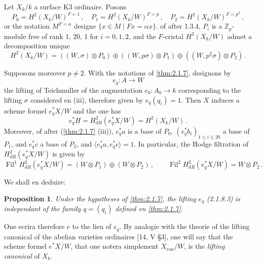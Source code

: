 \documentclass[12pt,a4paper]{article}
\theoremstyle{plain}
\newtheorem{proposition}[theorem]{Proposition}
\theoremstyle{definition}
\theoremstyle{remark}
\DeclareMathOperator{\Fil}{Fil}
\begin{document}
\paragraph{}

Let $X_k/k$ a surface K3 ordinaire. Posons
\begin{equation}\label{eq:2.1.8.1}
P_0 = H^2(X_k/W)^{F=1}\,, \quad P_1 = H^2(X_k/W)^{F=p}\,, \quad P_2 = H^2(X_k/W)^{F=p^2}\,,
\end{equation}
or the notation $M^{F=\alpha}$ designe $\{x \in M \mid Fx = \alpha x\}$. of after 1.3.4, $P_i$ is a $\mathbb{Z}_p$-module free of rank 1, 20, 1 for $i = 0, 1, 2$, and the $F$-cristal $H^2(X_k/W)$ admet a decomposition unique
\begin{equation}\label{eq:2.1.8.2}
H^2(X_k/W) = ((W, \sigma) \otimes P_0) \oplus ((W, p\sigma) \otimes P_1) \oplus ((W, p^2\sigma) \otimes P_2)\,.\end{equation}

Supposons moreover $p \neq 2$. With the notations of \ref{thm:2.1.7}, designons by
\begin{equation}\label{eq:2.1.8.3}
e_q : A \longrightarrow W
\end{equation}
the lifting of Teichmuller of the augmentation $e_0 : A_0 \to k$ corresponding to the lifting $\sigma$ considered en (iii), therefore given by $e_q(q_i) = 1$.
Then $X$ induces a scheme formel $e_q^*X/W$ and the one has
\begin{equation}\label{eq:2.1.8.4}
e_q^*H = H_{dR}^2(e_q^*X/W) = H^2(X_k/W)\,.\end{equation}
Moreover, of after (\ref{thm:2.1.7} (iii)), $e_q^*a$ is a base of $P_0$, $(e_q^*b_i)_{1 \leq i \leq 20}$ a base of $P_1$, and $e_q^*c$ a base of $P_2$, and $\langle e_q^*a, e_q^*c\rangle = 1$. In particular, the Hodge filtration of $H_{dR}^2(e_q^*X/W)$ is given by
\begin{equation}\label{eq:2.1.8.5}
\Fil^1H_{dR}^2(e_q^*X/W) = (W \otimes P_1) \oplus (W \otimes P_2)\,, \qquad \Fil^2H_{dR}^2(e_q^*X/W) = W \otimes P_2\,.\end{equation}

We shall en deduire:

\begin{proposition}\label{prop:2.1.9}
Under the hypotheses of \ref{thm:2.1.7}, the lifting $e_q$ (2.1.8.3) is independant of the family $q = (q_i)$ defined en \ref{thm:2.1.7}.
\end{proposition}

One ecrira therefore $e$ to the lieu of $e_q$. By analogie with the theorie of the lifting canonical of the abelian varieties ordinaires [14, V \S 3], one will say that the scheme formel $e^*X/W$, that one notera simplement $X_{\mathrm{can}}/W$, is the \emph{lifting canonical} of $X_k$.
\end{document}

